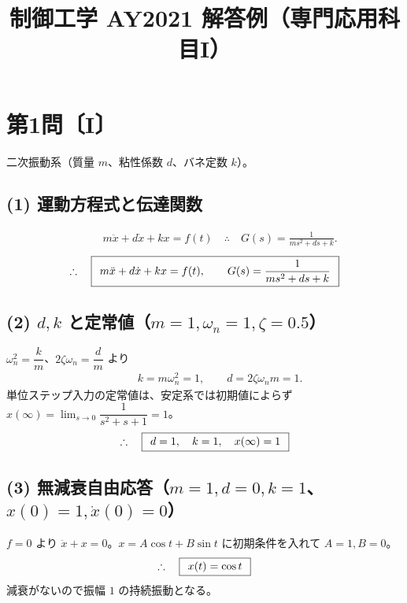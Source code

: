 \documentclass[11pt,a4paper]{article}
\title{制御工学 AY2021 解答例（専門応用科目I）}
\author{}
\date{}
\begin{document}
\maketitle

\section*{第1問〔I〕}

二次振動系（質量 $m$、粘性係数 $d$、バネ定数 $k$）。

\subsection*{(1) 運動方程式と伝達関数}
\begin{align*}
  &\qquad m\ddot{x}+d\dot{x}+kx=f(t)
   \quad\therefore\quad G(s)=\frac{1}{ms^2+ds+k}.
\end{align*}
\[
  \therefore\quad \boxed{\,\;m\ddot{x}+d\dot{x}+kx=f(t),\qquad G(s)=\dfrac{1}{ms^2+ds+k}\;\,}
\]

\subsection*{(2) $d,k$ と定常値（$m=1,\omega_n=1,\zeta=0.5$）}
$\omega_n^2=\dfrac{k}{m}$、$2\zeta\omega_n=\dfrac{d}{m}$ より
\begin{align*}
  &\qquad k=m\omega_n^2=1,\qquad d=2\zeta\omega_n m=1.
\end{align*}
単位ステップ入力の定常値は、安定系では初期値によらず $x(\infty)=\lim_{s\to0}\dfrac{1}{s^2+s+1}=1$。
\[
  \therefore\quad \boxed{\,\;d=1,\quad k=1,\quad x(\infty)=1\;\,}
\]

\subsection*{(3) 無減衰自由応答（$m=1,d=0,k=1$、$x(0)=1,\dot x(0)=0$）}
$f=0$ より $\ddot{x}+x=0$。$x=A\cos t+B\sin t$ に初期条件を入れて $A=1,B=0$。
\[
  \therefore\quad \boxed{\,\;x(t)=\cos t\;\,}
\]
減衰がないので振幅 $1$ の持続振動となる。

\begin{center}
\end{center}
\end{document}
